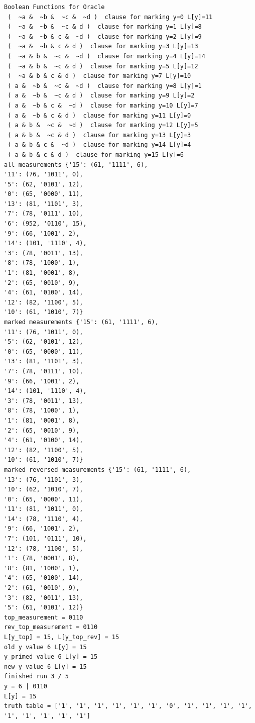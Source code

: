 \documentclass[11pt]{article}
\begin{document}
\begin{verbatim}
Boolean Functions for Oracle
 (  ~a &  ~b &  ~c &  ~d )  clause for marking y=0 L[y]=11
 (  ~a &  ~b &  ~c & d )  clause for marking y=1 L[y]=8
 (  ~a &  ~b & c &  ~d )  clause for marking y=2 L[y]=9
 (  ~a &  ~b & c & d )  clause for marking y=3 L[y]=13
 (  ~a & b &  ~c &  ~d )  clause for marking y=4 L[y]=14
 (  ~a & b &  ~c & d )  clause for marking y=5 L[y]=12
 (  ~a & b & c & d )  clause for marking y=7 L[y]=10
 ( a &  ~b &  ~c &  ~d )  clause for marking y=8 L[y]=1
 ( a &  ~b &  ~c & d )  clause for marking y=9 L[y]=2
 ( a &  ~b & c &  ~d )  clause for marking y=10 L[y]=7
 ( a &  ~b & c & d )  clause for marking y=11 L[y]=0
 ( a & b &  ~c &  ~d )  clause for marking y=12 L[y]=5
 ( a & b &  ~c & d )  clause for marking y=13 L[y]=3
 ( a & b & c &  ~d )  clause for marking y=14 L[y]=4
 ( a & b & c & d )  clause for marking y=15 L[y]=6
all measurements {'15': (61, '1111', 6),
'11': (76, '1011', 0),
'5': (62, '0101', 12),
'0': (65, '0000', 11),
'13': (81, '1101', 3),
'7': (78, '0111', 10),
'6': (952, '0110', 15),
'9': (66, '1001', 2),
'14': (101, '1110', 4),
'3': (78, '0011', 13),
'8': (78, '1000', 1),
'1': (81, '0001', 8),
'2': (65, '0010', 9),
'4': (61, '0100', 14),
'12': (82, '1100', 5),
'10': (61, '1010', 7)}
marked measurements {'15': (61, '1111', 6),
'11': (76, '1011', 0),
'5': (62, '0101', 12),
'0': (65, '0000', 11),
'13': (81, '1101', 3),
'7': (78, '0111', 10),
'9': (66, '1001', 2),
'14': (101, '1110', 4),
'3': (78, '0011', 13),
'8': (78, '1000', 1),
'1': (81, '0001', 8),
'2': (65, '0010', 9),
'4': (61, '0100', 14),
'12': (82, '1100', 5),
'10': (61, '1010', 7)}
marked reversed measurements {'15': (61, '1111', 6),
'13': (76, '1101', 3),
'10': (62, '1010', 7),
'0': (65, '0000', 11),
'11': (81, '1011', 0),
'14': (78, '1110', 4),
'9': (66, '1001', 2),
'7': (101, '0111', 10),
'12': (78, '1100', 5),
'1': (78, '0001', 8),
'8': (81, '1000', 1),
'4': (65, '0100', 14),
'2': (61, '0010', 9),
'3': (82, '0011', 13),
'5': (61, '0101', 12)}
top_measurement = 0110
rev_top_measurement = 0110
L[y_top] = 15, L[y_top_rev] = 15
old y value 6 L[y] = 15
y_primed value 6 L[y] = 15
new y value 6 L[y] = 15
finished run 3 / 5
y = 6 | 0110
L[y] = 15
truth table = ['1', '1', '1', '1', '1', '1', '0', '1', '1', '1', '1', '1', '1', '1', '1', '1']


\end{verbatim}
\end{document}

